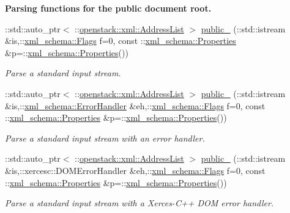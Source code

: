 \begin{Indent}{\bf Parsing functions for the public document root.}
\begin{DoxyCompactItemize}
::std::auto\_\-ptr$<$ ::\hyperlink{classopenstack_1_1xml_1_1AddressList}{openstack::xml::AddressList} $>$ \hyperlink{namespaceopenstack_1_1xml_a5044ea99468b52cfa59be8f9ee2f9c3b}{public\_\-} (::std::istream \&is,::\hyperlink{namespacexml__schema_affb4c227cbd9aa7453dd1dc5a1401943}{xml\_\-schema::Flags} f=0, const ::\hyperlink{namespacexml__schema_ad27ce19a7ee1d3b1064092648898f64c}{xml\_\-schema::Properties} \&p=::\hyperlink{namespacexml__schema_ad27ce19a7ee1d3b1064092648898f64c}{xml\_\-schema::Properties}())
\begin{DoxyCompactList}\small\item\em Parse a standard input stream. \item\end{DoxyCompactList}\item 
::std::auto\_\-ptr$<$ ::\hyperlink{classopenstack_1_1xml_1_1AddressList}{openstack::xml::AddressList} $>$ \hyperlink{namespaceopenstack_1_1xml_a9fca6b451aa61191bfb3e13b119574c6}{public\_\-} (::std::istream \&is,::\hyperlink{namespacexml__schema_ab1c9361bfd3b404eaabf0c31eded79dc}{xml\_\-schema::ErrorHandler} \&eh,::\hyperlink{namespacexml__schema_affb4c227cbd9aa7453dd1dc5a1401943}{xml\_\-schema::Flags} f=0, const ::\hyperlink{namespacexml__schema_ad27ce19a7ee1d3b1064092648898f64c}{xml\_\-schema::Properties} \&p=::\hyperlink{namespacexml__schema_ad27ce19a7ee1d3b1064092648898f64c}{xml\_\-schema::Properties}())
\begin{DoxyCompactList}\small\item\em Parse a standard input stream with an error handler. \item\end{DoxyCompactList}\item 
::std::auto\_\-ptr$<$ ::\hyperlink{classopenstack_1_1xml_1_1AddressList}{openstack::xml::AddressList} $>$ \hyperlink{namespaceopenstack_1_1xml_ae99b71a00855e1aa6906ec1e281e9ca6}{public\_\-} (::std::istream \&is,::xercesc::DOMErrorHandler \&eh,::\hyperlink{namespacexml__schema_affb4c227cbd9aa7453dd1dc5a1401943}{xml\_\-schema::Flags} f=0, const ::\hyperlink{namespacexml__schema_ad27ce19a7ee1d3b1064092648898f64c}{xml\_\-schema::Properties} \&p=::\hyperlink{namespacexml__schema_ad27ce19a7ee1d3b1064092648898f64c}{xml\_\-schema::Properties}())
\begin{DoxyCompactList}\small\item\em Parse a standard input stream with a Xerces-\/C++ DOM error handler. \item\end{DoxyCompactList}\item 

\end{DoxyCompactItemize}
\end{Indent}
